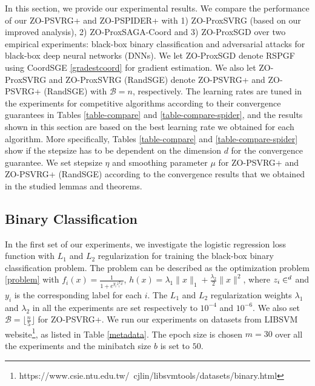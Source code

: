 \documentclass[iicol,sn-basic]{sn-jnl}
\theoremstyle{thmstyleone}%
\theoremstyle{thmstyletwo}%
\theoremstyle{thmstylethree}%
\let\R\relax
\newcommand*{\R}{\mathbb{R}}
\begin{document}
In this section, we provide our experimental results. We compare the performance of
our ZO-PSVRG+ and ZO-PSPIDER+ with 1) ZO-ProxSVRG (based on our improved analysis), 2) ZO-ProxSAGA-Coord \cite{gu2018faster} and 3) ZO-ProxSGD \cite{ghadimi2016accelerated} over two empirical experiments: black-box binary classification and adversarial attacks for black-box deep neural networks (DNNs). We let ZO-ProxSGD denote RSPGF using CoordSGE \eqref{gradestcoord} for gradient estimation. We also let ZO-ProxSVRG and ZO-ProxSVRG (RandSGE) denote ZO-PSVRG+ and ZO-PSVRG+ (RandSGE) with $\mathcal{B} = n$, respectively. The learning rates are tuned in the experiments for competitive algorithms according to their convergence guarantees in Tables \ref{table-compare} and \ref{table-compare-spider}, and the results shown in this section are based on the best learning rate we obtained for each algorithm. More specifically, Tables \ref{table-compare} and \ref{table-compare-spider} show if the stepsize has to be dependent on the dimension $d$ for the convergence guarantee. We set stepsize $\eta$ and smoothing parameter $\mu$ for ZO-PSVRG+ and ZO-PSVRG+ (RandSGE) according to the convergence results that we obtained in the studied lemmas and theorems.

\subsection{Binary Classification}

In the first set of our experiments, we investigate the logistic regression loss function with $L_1$ and $L_2$ regularization for training the black-box binary classification problem. The problem can be described as the optimization problem \eqref{problem} with $f_i(x) = \frac{1}{1+e^{y_iz^T_i{x}}}$, $h(x) = \lambda_1\|{x}\|_1 + \frac{\lambda_2}{2}\|{x}\|^2$, where $z_i\in\R^d$ and $y_i$ is the corresponding label for each $i$. The $L_1$ and $L_2$ regularization weights $\lambda_1$ and $\lambda_2$ in all the experiments are set respectively to $10^{-4}$ and $10^{-6}$. We also set $\mathcal{B} = \lfloor{\frac{n}{5}}\rfloor$ for ZO-PSVRG+. We run our experiments on datasets from LIBSVM website{\footnote{https://www.csie.ntu.edu.tw/~cjlin/libsvmtools/datasets/binary.html}}, as listed in Table \ref{metadata}. The epoch size is chosen $m = 30$ over all the  experiments and the minibatch size $b$ is set to $50$. 
 
\end{document}
